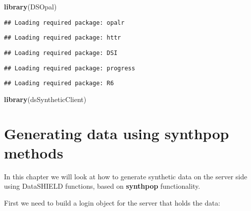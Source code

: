 \documentclass[
]{book}
\newenvironment{Shaded}{\begin{snugshade}}{\end{snugshade}}
\newcommand{\CommentTok}[1]{\textcolor[rgb]{0.56,0.35,0.01}{\textit{#1}}}
\newcommand{\DataTypeTok}[1]{\textcolor[rgb]{0.13,0.29,0.53}{#1}}
\newcommand{\KeywordTok}[1]{\textcolor[rgb]{0.13,0.29,0.53}{\textbf{#1}}}
\newcommand{\NormalTok}[1]{#1}
\newcommand{\OperatorTok}[1]{\textcolor[rgb]{0.81,0.36,0.00}{\textbf{#1}}}
\newcommand{\StringTok}[1]{\textcolor[rgb]{0.31,0.60,0.02}{#1}}
\begin{document}
\begin{Shaded}
\begin{Highlighting}[]
\KeywordTok{library}\NormalTok{(DSOpal)}
\end{Highlighting}
\end{Shaded}

\begin{verbatim}
## Loading required package: opalr
\end{verbatim}

\begin{verbatim}
## Loading required package: httr
\end{verbatim}

\begin{verbatim}
## Loading required package: DSI
\end{verbatim}

\begin{verbatim}
## Loading required package: progress
\end{verbatim}

\begin{verbatim}
## Loading required package: R6
\end{verbatim}

\begin{Shaded}
\begin{Highlighting}[]
\KeywordTok{library}\NormalTok{(dsSyntheticClient)}
\end{Highlighting}
\end{Shaded}

\hypertarget{synthpop}{%
\chapter{Generating data using synthpop methods}\label{synthpop}}

In this chapter we will look at how to generate synthetic data on the server side using DataSHIELD functions, based on \textbf{synthpop} functionality.

First we need to build a login object for the server that holds the data:

\begin{Shaded}
\end{Shaded}
\end{document}
